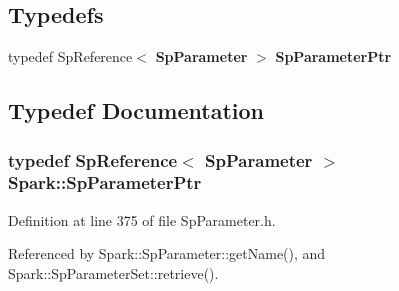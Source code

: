 \subsection*{Typedefs}
\begin{CompactItemize}
\item 
typedef Sp\-Reference$<$ {\bf Sp\-Parameter} $>$ {\bf Sp\-Parameter\-Ptr}
\end{CompactItemize}


\subsection{Typedef Documentation}
\subsubsection{\setlength{\rightskip}{0pt plus 5cm}typedef Sp\-Reference$<$ {\bf Sp\-Parameter} $>$ {\bf Spark::Sp\-Parameter\-Ptr}}\label{namespaceSpark_a1}


Definition at line 375 of file Sp\-Parameter.h.

Referenced by Spark::Sp\-Parameter::get\-Name(), and Spark::Sp\-Parameter\-Set::retrieve().
